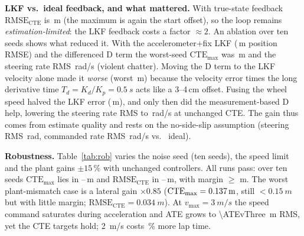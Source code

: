 \documentclass[conference]{IEEEtran}
\begin{document}
\begin{table}[t]
\caption{Nominal lap metrics (1:10) vs.\ targets}
\label{tab:nav}
\centering
{}
\end{table}

\textbf{LKF vs.\ ideal feedback, and what mattered.} With true-state feedback $\mathrm{RMSE}_\mathrm{CTE}$ is \idealCTErmse\,m (the maximum is again the start offset), so the loop remains \emph{estimation-limited}: the LKF feedback costs a factor $\approx2$. An ablation over ten seeds shows what reduced it. With the accelerometer+fix LKF (\navNoFusedLKF\,m position RMSE) and the differenced D term the worst-seed $\mathrm{CTE}_{\max}$ was \ablActe\,m and the steering rate RMS \steerRateOld\,rad/s (violent chatter). Moving the D term to the LKF velocity alone made it \emph{worse} (worst \ablCcte\,m) because the velocity error times the long derivative time $T_d=K_d/K_p=\SI{0.5}{s}$ acts like a 3--4\,cm offset. Fusing the wheel speed halved the LKF error (\navFusedLKF\,m), and only then did the measurement-based D help, lowering the steering rate RMS to \steerRateNew\,rad/s at unchanged CTE. The gain thus comes from estimate quality and rests on the no-side-slip assumption (steering RMS \deltaRMS\,rad, commanded rate RMS \deltaRateRMS\,rad/s vs.\ \idealDeltaRate{} ideal).

\textbf{Robustness.} Table~\ref{tab:rob} varies the noise seed (ten seeds), the speed limit and the plant gains $\pm15\,\%$ with unchanged controllers. All runs pass: over ten seeds $\mathrm{CTE}_{\max}$ lies in \seedCTElo--\seedCTEhi\,m and $\mathrm{RMSE}_\mathrm{CTE}$ in \seedRMSElo--\seedRMSEhi\,m, with margin $\ge$\,\marginMinRob\,m. The worst plant-mismatch case is a lateral gain $\times0.85$ ($\mathrm{CTE}_{\max}=\SI{0.137}{m}$, still $<\SI{0.15}{m}$ but with little margin; $\mathrm{RMSE}_\mathrm{CTE}=\SI{0.034}{m}$). At $v_\mathrm{max}=\SI{3}{m/s}$ the speed command saturates during acceleration and ATE grows to \SI{\ATEvThree}{m} RMS, yet the CTE targets hold; \SI{2}{m/s} costs \lapIncrease\,\% more lap time.
\end{document}
